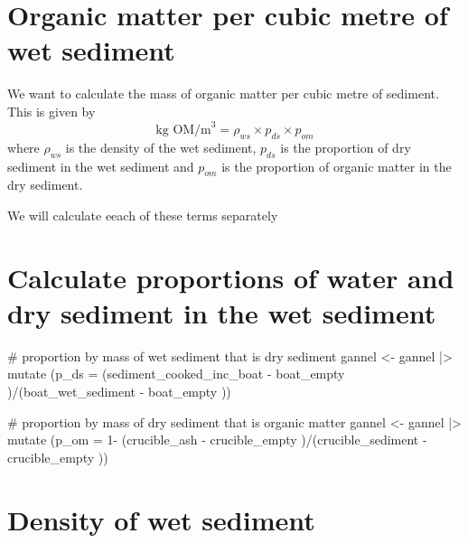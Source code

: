 \documentclass[
  letterpaper,
  DIV=11,
  numbers=noendperiod]{scrreprt}
\newenvironment{Shaded}{\begin{snugshade}}{\end{snugshade}}
\newcommand{\AttributeTok}[1]{\textcolor[rgb]{0.40,0.45,0.13}{#1}}
\newcommand{\CommentTok}[1]{\textcolor[rgb]{0.37,0.37,0.37}{#1}}
\newcommand{\DecValTok}[1]{\textcolor[rgb]{0.68,0.00,0.00}{#1}}
\newcommand{\FunctionTok}[1]{\textcolor[rgb]{0.28,0.35,0.67}{#1}}
\newcommand{\NormalTok}[1]{\textcolor[rgb]{0.00,0.23,0.31}{#1}}
\newcommand{\OtherTok}[1]{\textcolor[rgb]{0.00,0.23,0.31}{#1}}
\newcommand{\SpecialCharTok}[1]{\textcolor[rgb]{0.37,0.37,0.37}{#1}}
\begin{document}
\section{Organic matter per cubic metre of wet
sediment}\label{organic-matter-per-cubic-metre-of-wet-sediment}

We want to calculate the mass of organic matter per cubic metre of
sediment. This is given by \[
\text{kg OM/m}^3 = \rho_{ws} \times p_{ds} \times p_{om}
\] where \(\rho_{ws}\) is the density of the wet sediment, \(p_{ds}\) is
the proportion of dry sediment in the wet sediment and \(p_{om}\) is the
proportion of organic matter in the dry sediment.

We will calculate eeach of these terms separately

\section{Calculate proportions of water and dry sediment in the wet
sediment}\label{calculate-proportions-of-water-and-dry-sediment-in-the-wet-sediment}

\begin{Shaded}
\begin{Highlighting}[]
\CommentTok{\# proportion by mass of wet sediment that is dry sediment}
\NormalTok{gannel }\OtherTok{\textless{}{-}}\NormalTok{ gannel }\SpecialCharTok{|\textgreater{}}
  \FunctionTok{mutate}\NormalTok{ (}\AttributeTok{p\_ds =}\NormalTok{ (sediment\_cooked\_inc\_boat }\SpecialCharTok{{-}}\NormalTok{ boat\_empty )}\SpecialCharTok{/}\NormalTok{(boat\_wet\_sediment  }\SpecialCharTok{{-}}\NormalTok{ boat\_empty ))}
\end{Highlighting}
\end{Shaded}

\begin{Shaded}
\begin{Highlighting}[]
\CommentTok{\# proportion by mass of dry sediment that is organic matter}
\NormalTok{gannel }\OtherTok{\textless{}{-}}\NormalTok{ gannel }\SpecialCharTok{|\textgreater{}}
  \FunctionTok{mutate}\NormalTok{ (}\AttributeTok{p\_om =} \DecValTok{1}\SpecialCharTok{{-}}\NormalTok{  (crucible\_ash }\SpecialCharTok{{-}}\NormalTok{ crucible\_empty )}\SpecialCharTok{/}\NormalTok{(crucible\_sediment  }\SpecialCharTok{{-}}\NormalTok{ crucible\_empty ))}
\end{Highlighting}
\end{Shaded}

\section{Density of wet sediment}\label{density-of-wet-sediment}
\end{document}
